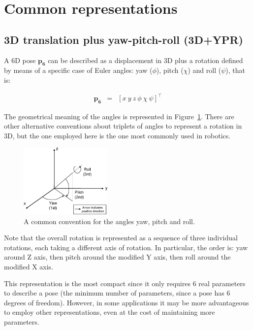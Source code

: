 \documentclass[a4paper,10pt]{report}
\begin{document}
\newpage

\section{Common representations}


\subsection{3D translation plus yaw-pitch-roll (3D+YPR)}

A 6D pose $\mathbf{p_6}$ can be described as a displacement in 3D plus a rotation defined by 
means of a specific case of Euler angles: yaw ($\phi$), pitch
($\chi$) and roll ($\psi$), that is:

\begin{eqnarray}
\mathbf{p_6} &=& [x ~ y ~ z ~ \phi ~ \chi ~ \psi]^\top
\end{eqnarray}

The geometrical meaning of the angles is represented in Figure~\ref{fig:ypr}. 
There are other alternative conventions about triplets of angles to represent a rotation in 3D, but
the one employed here is the one most commonly used in robotics. 

\begin{figure}[h]
\centering
\includegraphics[width=0.40\textwidth]{fig1.eps}
\caption{A common convention for the angles yaw, pitch and roll.}
\label{fig:ypr}
\end{figure}

Note that the overall rotation is represented as a sequence of three individual rotations, 
each taking a different axis of rotation. 
In particular, the order is: yaw around Z axis, then pitch around the modified Y axis, 
then roll around the modified X axis.

This representation is the most compact since it only requires 6 real parameters
to describe a pose (the minimum number of parameters, since a pose has 6 degrees of freedom).
However, in some applications it may be more advantageous to employ other representations, 
even at the cost of maintaining more parameters.
\end{document}
